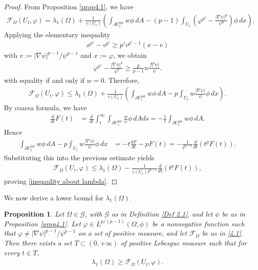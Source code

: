 \documentclass[11pt,leqno]{amsart}
\newtheorem{proposition}{Proposition}[section]
\numberwithin{equation}{section}
\begin{document}
\begin{proof}
From Proposition \ref{prop4.1}, we have
    \begin{align*}
        \mathcal{F}_{\Omega}(U_{t}, \varphi)
= \lambda_{1}(\Omega)
+ \frac{1}{\gamma (U_t)}
\left(
\int_{\partial U_t^{\mathrm{int}}} w \phi \,dA
- (p-1) \int_{U_{t}} (\varphi^{p'} - \frac{|\nabla \psi|^{p}}{\psi^{p}})\phi  \, dx
\right).
    \end{align*}
Applying the elementary inequality
    \begin{align*}
        x^{p'}-v^{p'}\geq p'v^{p'-1}(x-v)
    \end{align*}
    with \( v := |\nabla \psi|^{p-1}/\psi^{p-1} \)  and \(x:=\varphi\), we obtain
\begin{align*}
\varphi^{p'} - \frac{|\nabla \psi|^p}{\psi^p} \geq \frac{p}{p-1} w \frac{|\nabla \psi|}{\psi}. 
\end{align*}
with equality if and only if $w = 0 $. Therefore,
\begin{align*}
\mathcal{F}_{\Omega}(U_t, \varphi) \leq \lambda_1(\Omega) + \frac{1}{\gamma (U_t)}
\left(
\int_{\partial U_t^{\mathrm{int}}} w \phi \,dA
- p \int_{U_t} w \frac{|\nabla \psi|}{\psi} \phi \, dx
\right).
\end{align*}
By coarea formula, we have 
\begin{align*}
    \frac{d}{dt}F(t)&=\frac{d}{dt}\int_{t}^{\infty}\int_{\partial U_s^{\mathrm{int}}}\frac{w}{\psi}\phi \, dA ds=-\frac{1}{t}\int_{\partial U_t^{\mathrm{int}}}w\phi  \, dA.
\end{align*}
Hence 
\begin{align*}
    \int_{\partial U_t^{\mathrm{int}}} w \phi \,dA
- p \int_{U_t} w \frac{|\nabla \psi|}{\psi} \phi \, dx&=-t\frac{dF}{dt}-pF(t)=-\frac{1}{t^{p-1}}\frac{d}{dt}(t^{p}F(t)).
\end{align*}
Substituting this into the previous estimate yields 
\begin{align*}
     \mathcal{F}_{\Omega}(U_t, \varphi) \leq \lambda_1(\Omega) - \frac{1}{\gamma (U_t) t^{p-1}} \frac{d}{dt} \left( t^p F(t) \right),
\end{align*}
proving \eqref{ineqaulity about lambda}.
\end{proof}
We now derive a lower bound for  $\lambda_1(\Omega)$. 
\begin{proposition} \label{theorem3}
   Let $\Omega \in \mathcal{G}$, with $\mathcal{G}$ as in Definition \ref{Def 2.1}, and let $\psi$ be as in Proposition \ref{prop4.1}.
Let $\varphi \in L^{p/(p-1)}(\Omega, \phi )$ be a nonnegative function such that $\varphi \neq |\nabla \psi|^{p-1}/\psi^{p-1}$ on a set of positive measure, and let $\mathcal{F}_\Omega$ be as in \eqref{4.1}. Then there exists a set $T \subset (0, +\infty)$ of positive Lebesgue measure such that for every $t \in T$, 
\begin{align*}
\lambda_1(\Omega) \geq \mathcal{F}_\Omega(U_t, \varphi). 
\end{align*}
\end{proposition}
\end{document}
